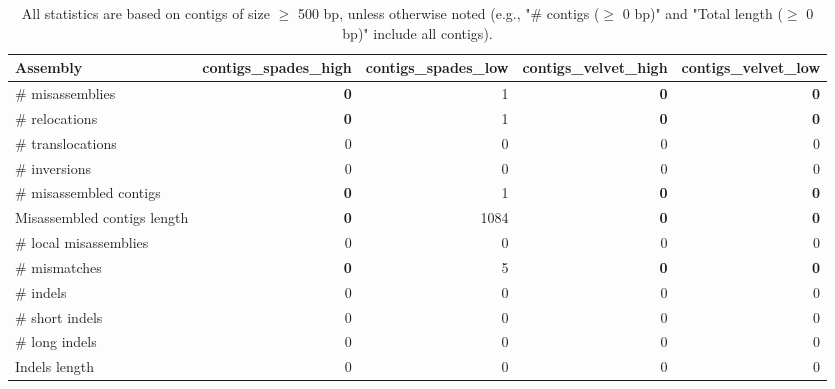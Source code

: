 \documentclass[12pt,a4paper]{article}
\begin{document}
\begin{table}[ht]
\begin{center}
\caption{All statistics are based on contigs of size $\geq$ 500 bp, unless otherwise noted (e.g., "\# contigs ($\geq$ 0 bp)" and "Total length ($\geq$ 0 bp)" include all contigs).}
\begin{tabular}{|l*{4}{|r}|}
\hline
Assembly & contigs\_spades\_high & contigs\_spades\_low & contigs\_velvet\_high & contigs\_velvet\_low \\ \hline
\# misassemblies & {\bf 0} & 1 & {\bf 0} & {\bf 0} \\ \hline
\hspace{5mm}\# relocations & {\bf 0} & 1 & {\bf 0} & {\bf 0} \\ \hline
\hspace{5mm}\# translocations & 0 & 0 & 0 & 0 \\ \hline
\hspace{5mm}\# inversions & 0 & 0 & 0 & 0 \\ \hline
\# misassembled contigs & {\bf 0} & 1 & {\bf 0} & {\bf 0} \\ \hline
Misassembled contigs length & {\bf 0} & 1084 & {\bf 0} & {\bf 0} \\ \hline
\# local misassemblies & 0 & 0 & 0 & 0 \\ \hline
\# mismatches & {\bf 0} & 5 & {\bf 0} & {\bf 0} \\ \hline
\# indels & 0 & 0 & 0 & 0 \\ \hline
\hspace{5mm}\# short indels & 0 & 0 & 0 & 0 \\ \hline
\hspace{5mm}\# long indels & 0 & 0 & 0 & 0 \\ \hline
Indels length & 0 & 0 & 0 & 0 \\ \hline
\end{tabular}
\end{center}
\end{table}
\end{document}
